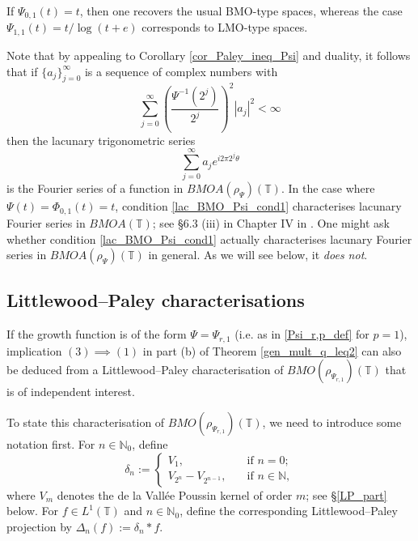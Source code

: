 \documentclass[a4paper, leqno, 10pt]{amsart}
\numberwithin{equation}{section}
\newcommand{\T}{\mathbb{T}}
\newcommand{\N}{\mathbb{N}}
\begin{document}
If $\Psi_{0,1} (t)=t$, then one recovers the usual BMO-type spaces, whereas the case $\Psi_{1,1} (t)=t /\log(t+e)$ corresponds to LMO-type spaces. %

Note that by appealing to Corollary \ref{cor_Paley_ineq_Psi} and duality, it follows that if $\{ a_j \}_{j=0}^{\infty}$ is a sequence of complex numbers with
\begin{equation}\label{lac_BMO_Psi_cond1}
\sum_{j=0}^{\infty} \left( \frac{\Psi^{-1} (2^j) } {2^j} \right)^2  |a_j|^2  < \infty
\end{equation}
then the lacunary trigonometric series
\[
\sum_{j = 0}^{\infty} a_j e^{i 2\pi 2^j \theta}
\]
is the Fourier series of a function in $BMOA (\rho_{\Psi})(\T)$. In the case where $\Psi (t) = \Phi_{0,1} (t) = t$, condition \eqref{lac_BMO_Psi_cond1} characterises lacunary Fourier series in $BMOA (\T)$; see \S 6.3 (iii) in Chapter IV in \cite{Big_Stein}.  
 One might ask whether condition \eqref{lac_BMO_Psi_cond1} actually characterises lacunary Fourier series in $BMOA (\rho_{\Psi})(\T)$ in general. As we will see below, it {\it does not}.
 
\subsection*{Littlewood--Paley characterisations}
If the growth function is of the form $\Psi= \Psi_{r,1}$ (i.e.  as in \eqref{Psi_r,p_def} for $p=1$), implication $(3)\implies (1)$ in part (b) of Theorem \ref{gen_mult_q_leq2} can also be deduced from a Littlewood--Paley characterisation of $BMO (\rho_{\Psi_{r,1}}) (\T)$ that is of independent interest. 

To state this characterisation of $BMO(\rho_{\Psi_{r,1}})(\T)$, we need to introduce some notation first. For $n \in \N_0$, define
\[ 
\delta_n  :=
\begin{cases}
V_1  , \quad & \text{if } n=0;  \\
  V_{2^n} - V_{2^{n-1}} , \quad & \text{if } n \in \N,
\end{cases}
\]
where $V_m$ denotes the de la Vall\'ee Poussin kernel of order $m$; see \S \ref{LP_part} below. For $f \in L^1 (\T)$ and $n \in \N_0$, define the corresponding Littlewood--Paley projection by $ \Delta_n (f ) := \delta_n \ast f $.
\end{document}
